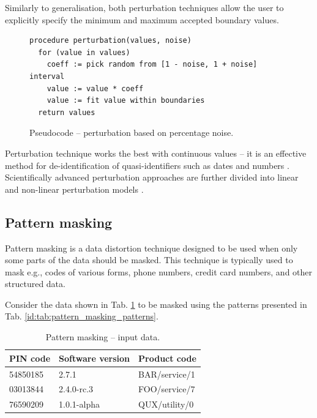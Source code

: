 \documentclass[a4paper,twoside,12pt]{book}
\begin{document}
Similarly to generalisation, both perturbation techniques allow the user to explicitly specify the minimum and maximum accepted boundary values.

\begin{figure}[h]
\begin{verbatim}
procedure perturbation(values, noise)
  for (value in values)
    coeff := pick random from [1 - noise, 1 + noise] interval
    value := value * coeff
    value := fit value within boundaries
  return values
\end{verbatim}
\caption{Pseudocode – perturbation based on percentage noise.}
\label{fig:code:perturbation_percentage}
\end{figure}

Perturbation technique works the best with continuous values -- it is an effective method for de-identification of quasi-identifiers such as dates and numbers \cite{bib:anonymisation_techniques_singapore}. Scientifically advanced perturbation approaches are further divided into linear and non-linear perturbation models \cite{bib:perturbation_methods}.


\subsection{Pattern masking}

Pattern masking is a data distortion technique designed to be used when only some parts of the data should be masked. This technique is typically used to mask e.g., codes of various forms, phone numbers, credit card numbers, and other structured data. 

Consider the data shown in Tab. \ref{id:tab:pattern_masking_raw} to be masked using the patterns presented in Tab. \ref{id:tab:pattern_masking_patterns}.

\begin{table}%
\centering
\caption{Pattern masking – input data.}
\label{id:tab:pattern_masking_raw}
\begin{tabular}{lll}
\toprule
PIN code & Software version & Product code  \\ \midrule
54850185 & 2.7.1            & BAR/service/1 \\
03013844 & 2.4.0-rc.3       & FOO/service/7 \\
76590209 & 1.0.1-alpha      & QUX/utility/0 \\ \bottomrule
\end{tabular}
\end{table}
\end{document}
